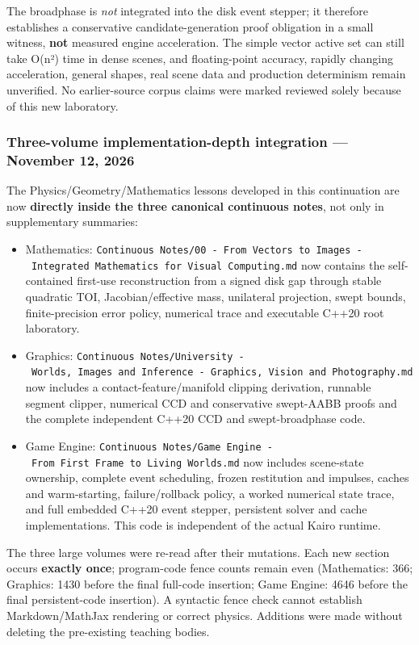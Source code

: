 The broadphase is \emph{not} integrated into the disk event stepper; it therefore establishes a conservative candidate-generation proof obligation in a small witness, \textbf{not} measured engine acceleration. The simple vector active set can still take O(n²) time in dense scenes, and floating-point accuracy, rapidly changing acceleration, general shapes, real scene data and production determinism remain unverified. No earlier-source corpus claims were marked reviewed solely because of this new laboratory.

\subsubsection{Three-volume implementation-depth integration --- November 12, 2026}\label{appendix-3b67654799a2-three-volume-implementation-depth-integration-november-12-2026}

The Physics/Geometry/Mathematics lessons developed in this continuation are now \textbf{directly inside the three canonical continuous notes}, not only in supplementary summaries:

\begin{itemize}
\tightlist
\item
  Mathematics: \texttt{Continuous\ Notes/00\ -\ From\ Vectors\ to\ Images\ -\ Integrated\ Mathematics\ for\ Visual\ Computing.md} now contains the self-contained first-use reconstruction from a signed disk gap through stable quadratic TOI, Jacobian/effective mass, unilateral projection, swept bounds, finite-precision error policy, numerical trace and executable C++20 root laboratory.
\item
  Graphics: \texttt{Continuous\ Notes/University\ -\ Worlds,\ Images\ and\ Inference\ -\ Graphics,\ Vision\ and\ Photography.md} now includes a contact-feature/manifold clipping derivation, runnable segment clipper, numerical CCD and conservative swept-AABB proofs and the complete independent C++20 CCD and swept-broadphase code.
\item
  Game Engine: \texttt{Continuous\ Notes/Game\ Engine\ -\ From\ First\ Frame\ to\ Living\ Worlds.md} now includes scene-state ownership, complete event scheduling, frozen restitution and impulses, caches and warm-starting, failure/rollback policy, a worked numerical state trace, and full embedded C++20 event stepper, persistent solver and cache implementations. This code is independent of the actual Kairo runtime.
\end{itemize}

The three large volumes were re-read after their mutations. Each new section occurs \textbf{exactly once}; program-code fence counts remain even (Mathematics: 366; Graphics: 1430 before the final full-code insertion; Game Engine: 4646 before the final persistent-code insertion). A syntactic fence check cannot establish Markdown/MathJax rendering or correct physics. Additions were made without deleting the pre-existing teaching bodies.

